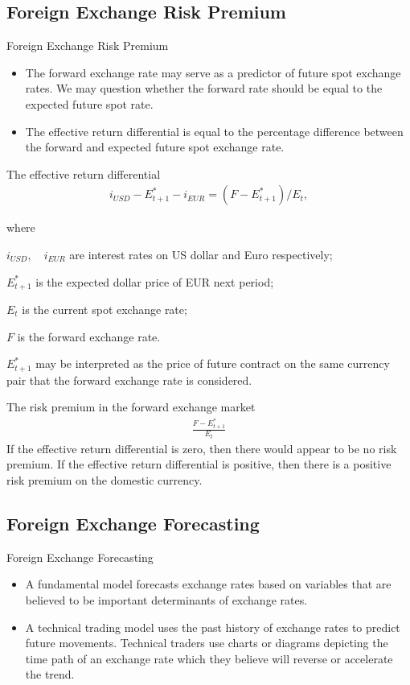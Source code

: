 \documentclass[international_finance_p2.tex]{subfiles}
\begin{document}
\subsection{Foreign Exchange Risk Premium}
\begin{frame}{Foreign Exchange Risk Premium}
\begin{itemize}[<+->]
\item
The forward exchange rate may serve as a predictor of future spot exchange rates. We may question whether the forward rate should be equal to the expected future spot rate.
\item
The effective return differential is equal to the percentage difference between the forward and expected future spot exchange rate.
\end{itemize}
\end{frame}

\begin{frame}{The effective return differential}
\begin{align}
i_{USD}-E_{t+1}^*-i_{EUR}=(F-E_{t+1}^*)/E_t,
\end{align}

where

$i_{USD}, \quad i_{EUR}$ are interest rates on US dollar and Euro respectively;

$E_{t+1}^*$ is the expected dollar price of EUR next period;

$E_t$ is the current spot exchange rate;

$F$ is the forward exchange rate.

$E_{t+1}^*$ may be interpreted as the price of future contract on the same currency pair that the forward exchange rate is considered.
\end{frame}

\begin{frame}{The risk premium in the forward exchange market}
\begin{align}
\frac{F-E_{t+1}^*}{E_t}
\end{align}
If the effective return differential is zero, then there would appear to be no risk premium. If the effective return differential is positive, then there is a positive risk premium on the domestic currency.
\end{frame}
\subsection{Foreign Exchange Forecasting}
\begin{frame}{Foreign Exchange Forecasting}
\begin{itemize}[<+->]
\item
A fundamental model forecasts exchange rates based on variables that are believed to be important determinants of exchange rates.
\item
A technical trading model uses the past history of exchange rates to predict future movements. Technical traders use charts or diagrams depicting the time path of an exchange rate which they believe will reverse or accelerate the trend. 
\end{itemize}
\end{frame}
\end{document}
